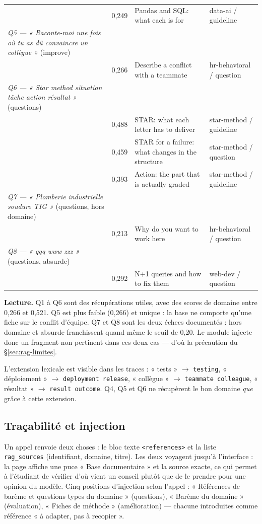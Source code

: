 \begin{small}
\begin{longtable}{@{}>{\cellflush}p{4.0cm} r
                  >{\cellflush}p{6.0cm}
                  >{\cellflush}p{3.0cm}@{}}
 & 0,249 & Pandas and SQL: what each is for & data-ai / guideline \\
\addlinespace
\emph{Q5 --- « Raconte-moi une fois où tu as dû convaincre un collègue »} (improve) & & & \\
 & 0,266 & Describe a conflict with a teammate & hr-behavioral / question \\
\addlinespace
\emph{Q6 --- « Star method situation tâche action résultat »} (questions) & & & \\
 & 0,488 & STAR: what each letter has to deliver & star-method / guideline \\
 & 0,459 & STAR for a failure: what changes in the structure & star-method / question \\
 & 0,393 & Action: the part that is actually graded & star-method / guideline \\
\addlinespace
\emph{Q7 --- « Plomberie industrielle soudure TIG »} (questions, hors domaine) & & & \\
 & 0,213 & Why do you want to work here & hr-behavioral / question \\
\addlinespace
\emph{Q8 --- « qqq www zzz »} (questions, absurde) & & & \\
 & 0,292 & N+1 queries and how to fix them & web-dev / question \\
\end{longtable}
\end{small}

\textbf{Lecture.} Q1 à Q6 sont des récupérations utiles, avec des scores de
domaine entre 0,266 et 0,521. Q5 est plus faible (0,266) et unique : la base ne
comporte qu'une fiche sur le conflit d'équipe. Q7 et Q8 sont les deux échecs
documentés : hors domaine et absurde franchissent quand même le seuil de 0,20.
Le module injecte donc un fragment non pertinent dans ces deux cas --- d'où la
précaution du §\ref{sec:rag-limites}.

L'extension lexicale est visible dans les traces : « tests » $\to$
\texttt{testing}, « déploiement » $\to$ \texttt{deployment release}, « collègue »
$\to$ \texttt{teammate colleague}, « résultat » $\to$ \texttt{result outcome}.
Q4, Q5 et Q6 ne récupèrent le bon domaine \emph{que} grâce à cette extension.

\subsection{Traçabilité et injection}

Un appel renvoie deux choses : le bloc texte \texttt{<references>} et la liste
\texttt{rag\_sources} (identifiant, domaine, titre). Les deux voyagent jusqu'à
l'interface : la page affiche une puce « Base documentaire » et la source
exacte, ce qui permet à l'étudiant de vérifier d'où vient un conseil plutôt que
de le prendre pour une opinion du modèle. Cinq positions d'injection selon
l'appel : « Références de barème et questions types du domaine » (questions),
« Barème du domaine » (évaluation), « Fiches de méthode » (amélioration) ---
chacune introduites comme référence « à adapter, pas à recopier ».

